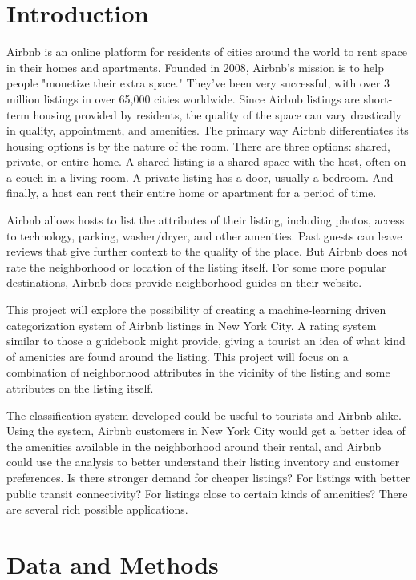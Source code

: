 \documentclass[conference]{IEEEtran}
\begin{document}
\section{Introduction}
\IEEEPARstart
Airbnb is an online platform for residents of cities around the world to rent space in their homes and apartments.
Founded in 2008, Airbnb's mission is to help people "monetize their extra space." They've
been very successful, with over 3 million listings in over 65,000 cities worldwide.\cite{airbnb_about_us}
Since Airbnb listings are short-term housing provided by residents, the quality of the space
can vary drastically in quality, appointment, and amenities. The primary way Airbnb differentiates
its housing options is by the nature of the room. There are three options: shared, private, or entire home. A shared listing
is a shared space with the host, often on a couch in a living room. A private listing has
a door, usually a bedroom. And finally, a host can rent their entire home or apartment for a period of time.

Airbnb allows hosts to list the attributes of their listing, including photos, access to
technology, parking, washer/dryer, and other amenities. Past guests can leave reviews
that give further context to the quality of the place. But Airbnb does not rate the neighborhood
or location of the listing itself. For some more popular destinations, Airbnb does provide
neighborhood guides on their website.

This project will explore the possibility of creating a machine-learning driven
categorization system of Airbnb listings in New York City. A rating system similar to
those a guidebook might provide, giving a tourist an idea of what kind of amenities are found
around the listing. This project will focus on a combination of neighborhood attributes in the 
vicinity of the listing and some attributes on the listing itself.

The classification system developed could be useful to tourists and Airbnb alike.
Using the system, Airbnb customers in New York City would get a better idea of the amenities available
in the neighborhood around their rental, and Airbnb could use the analysis to better understand
their listing inventory and customer preferences. Is there stronger demand for cheaper listings?
For listings with better public transit connectivity? For listings close to certain
kinds of amenities? There are several rich possible applications.

\section{Data and Methods}
\end{document}

